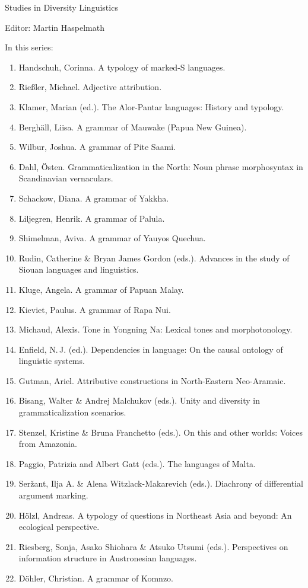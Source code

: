 {\large Studies in Diversity Linguistics}

\bigskip

Editor: Martin Haspelmath  

 
\bigskip 
In this series:


\small
\begin{enumerate}
\item Handschuh, Corinna. A typology of marked-S languages.
\item Rießler, Michael. Adjective attribution.
\item Klamer, Marian (ed.). The Alor-Pantar languages: History and typology.
\item Berghäll, Liisa. A grammar of Mauwake (Papua New Guinea).
\item Wilbur, Joshua. A grammar of Pite Saami.
\item Dahl, Östen. Grammaticalization in the North: Noun phrase morphosyntax in Scandinavian vernaculars.
\item Schackow, Diana.    A grammar of Yakkha.
\item Liljegren, Henrik. A grammar of Palula.
\item Shimelman, Aviva. A grammar of Yauyos Quechua.
\item Rudin, Catherine \& Bryan James Gordon (eds.). Advances in the study of Siouan languages and linguistics.
\item Kluge, Angela. A grammar of Papuan Malay.
\item Kieviet, Paulus. A grammar of Rapa Nui.
\item Michaud, Alexis. Tone in Yongning Na: Lexical tones and morphotonology.
\item Enfield, N.\,J. (ed.).  Dependencies in language: On the causal ontology of linguistic systems.
\item Gutman, Ariel. Attributive constructions in North-Eastern Neo-Aramaic.
\item Bisang, Walter \& Andrej Malchukov (eds.). Unity and diversity in grammaticalization scenarios.
\item Stenzel, Kristine \& Bruna Franchetto (eds.). On this and other worlds: Voices from Amazonia.
\item Paggio, Patrizia and Albert Gatt (eds.). The languages of Malta.
\item Seržant, Ilja A.  \& Alena Witzlack-Makarevich (eds.). Diachrony of differential argument marking.
\item Hölzl, Andreas. A typology of questions in Northeast Asia and beyond: An ecological perspective.
\item Riesberg, Sonja,  Asako Shiohara \& Atsuko Utsumi (eds.). Perspectives on information structure in Austronesian languages.
\item Döhler, Christian. A grammar of Komnzo.
\end{enumerate}
 
